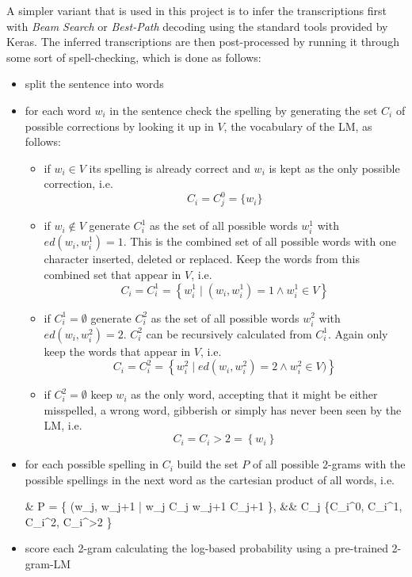 A simpler variant that is used in this project is to infer the transcriptions first with \textit{Beam Search} or \textit{Best-Path} decoding using the standard tools provided by Keras. The inferred transcriptions are then post-processed by running it through some sort of spell-checking, which is done as follows:

\begin{itemize}
	\item split the sentence into words 
	\item for each word $w_i$ in the sentence check the spelling by generating the set $C_i$ of possible corrections by looking it up in $V$, the vocabulary of the \ac{LM}, as follows:
	\begin{itemize}
		\item if $w_i \in V$ its spelling is already correct and $w_i$ is kept as the only possible correction, i.e.
		\begin{equation*}
			C_i = C_j^0 = \{ w_i \}
		\end{equation*}
		\item if $w_i \not\in V$ generate $C_i^1$ as the set of all possible words $w_i^1$ with $ed(w_i, w_i^1) = 1$. This is the combined set of all possible words with one character inserted, deleted or replaced. Keep the words from this combined set that appear in $V$, i.e.
		\begin{equation*}
			C_i = C_i^1 = \left \{ w_i^1 \mid (w_i, w_i^1) = 1 \land w_i^1 \in V \right \}
		\end{equation*}
		\item if $C_i^1 = \emptyset$ generate $C_i^2$ as the set of all possible words $w_i^2$ with $ed(w_i, w_i^2) = 2$. $C_i^2$ can be recursively calculated from $C_i^1$. Again only keep the words that appear in $V$, i.e.
		\begin{equation*}
			C_i = C_i^2 = \left \{ w_i^2 \mid ed(w_i, w_i^2) = 2 \land w_i^2 \in V) \right \}
		\end{equation*}
		\item if $C_i^2 = \emptyset$ keep $w_i$ as the only word, accepting that it might be either misspelled, a wrong word, gibberish or simply has never been seen by the \ac{LM}, i.e.
		\begin{equation*}
			C_i = C_i{>2} = \left \{ w_i  \right \}
		\end{equation*}
	\end{itemize}
	\item for each possible spelling in $C_i$ build the set $P$ of all possible 2-grams with the possible spellings in the next word as the cartesian product of all words, i.e.
	\begin{flalign*}
&	P = \{ (w_j, w_{j+1} | w_j \in C_j \land w_{j+1} \in C_{j+1} \}{,} && C_j \in \{C_i^0, C_i^1, C_i^2, C_i^{>2} \}
	\end{flalign*}
	\item score each 2-gram calculating the log-based probability using a pre-trained 2-gram-\ac{LM}
\end{itemize}

